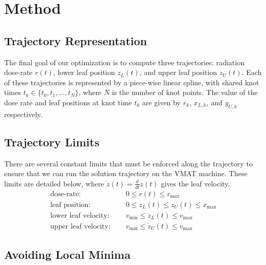 \section{Method}


\subsection{Trajectory Representation}

The final goal of our optimization is to compute three trajectories:
radiation dose-rate $r(t)$, lower leaf position $z_L(t)$, and upper leaf position $z_U(t)$.
Each of these trajectories is represented by a piece-wise linear spline,
with shared knot times $t_k \in \{t_0, t_1, \dots, t_N\}$, where $N$ is the number of knot points.
The value of the dose rate and leaf positions at knot time $t_k$ are given by
$r_k$, $x_{L,k}$, and $y_{U,k}$ respectively.


\subsection{Trajectory Limits}

There are several constant limits that must be enforced along the trajectory
to ensure that we can run the solution trajectory on the VMAT machine.
These limits are detailed below, where $\dot{z}(t) = \tfrac{d}{dt}z(t)$ gives the leaf velocity.
\begin{align}
  \text{dose-rate: }& \quad 0 \leq r(t) \leq r_\text{max} \\
  \text{leaf position: }& \quad 0 \leq z_L(t) \leq z_U(t) \leq x_\text{max} \\
  \text{lower leaf velocity: }& \quad v_\text{min} \leq \dot{z}_L(t) \leq v_\text{max} \\
  \text{upper leaf velocity: }& \quad v_\text{min} \leq \dot{z}_U(t) \leq v_\text{max}
\end{align}

\subsection{Avoiding Local Minima}


